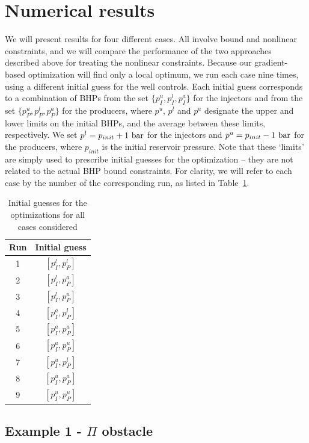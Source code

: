 \documentclass[twocolumn,numbook]{svjour3}          %
\begin{document}
\section{Numerical results}  \label{sec:results}

We will present results for four different cases. All involve bound and
nonlinear constraints, and we will compare the performance of the two approaches
described above for treating the nonlinear constraints. Because our
gradient-based optimization will find only a local optimum, we run each case
nine times, using a different initial guess for the well controls. Each initial
guess corresponds to a combination of BHPs from the set $\{p_I^u,p_I^l,p_I^a\}$
for the injectors and from the set $\{p_P^u,p_P^l,p_P^a\}$ for the producers,
where $p^u$, $p^l$ and $p^a$ designate the upper and lower limits on the
initial BHPs, and the average between these limits, respectively. We set
$p^l=p_{init}+1~{\rm bar}$ for the injectors and $p^u=p_{init}-1~{\rm bar}$
for the producers, where $p_{init}$ is the initial reservoir pressure. Note
that these `limits' are simply used to prescribe initial guesses for the
optimization -- they are not related to the actual BHP bound constraints.
For clarity, we will refer to each case by the number of the corresponding
run, as listed in Table~\ref{table:InitialGuesses}.



\begin{table}
\centering
\caption{Initial guesses for the optimizations for all
         cases considered}
\begin{tabular}{|c|c|}
\hline
Run & Initial guess    \\
\hline
1 & $[p_I^l, p_P^l]$ \\
2 & $[p_I^l, p_P^a]$ \\
3 & $[p_I^l, p_P^u]$ \\
4 & $[p_I^a, p_P^l]$ \\
5 & $[p_I^a, p_P^a]$ \\
6 & $[p_I^a, p_P^u]$ \\
7 & $[p_I^u, p_P^l]$ \\
8 & $[p_I^u, p_P^a]$ \\
9 & $[p_I^u, p_P^u]$ \\
\hline
\end{tabular}
  \label{table:InitialGuesses}
\end{table}





\subsection{Example 1 - $\Pi$ obstacle}
\end{document}
